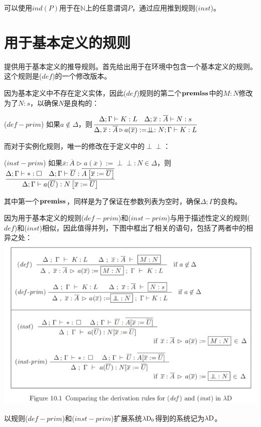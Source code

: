 \documentclass[UTF8]{article}
\newcommand{\dperp}{\perp\!\!\!\perp}
\begin{document}
		可以使用$ind(P)$用于在$\mathbb{N}$上的任意谓词$P$，通过应用推到规则($inst$)。
		
	\section{用于基本定义的规则}
	\noindent
	提供用于基本定义的推导规则。首先给出用于在环境中包含一个基本定义的规则。这个规则是($def$)的一个修改版本。
	
		因为基本定义中不存在定义实体，因此($def$)规则的第二个$\bf premiss$中的$M:N$修改为了$N:s$，以确保$N$是良构的：
		
		($def-prim$) 如果$a\notin\Delta$，则$\cfrac{\Delta;\Gamma\vdash K:L\ \ \ \Delta;\overline{x}:\overline{A}\vdash N:s}  {\Delta,\overline{x}:\overline{A}\triangleright a(\overline{x}):=\dperp:N;\Gamma\vdash K:L}$
		
		而对于实例化规则，唯一的修改在于定义中的$\dperp$：
		
		($inst-prim$) 如果$\overline{x}:\overline{A}\triangleright a(\overline{x}):=\dperp:N\in\Delta$，则$\cfrac{\Delta;\Gamma\vdash*:\square\ \ \ \Delta;\Gamma\vdash\overline{U}:\overline{A\left[\overline{x}:=\overline{U}\right]}}   {\Delta;\Gamma\vdash a(\overline{U}):N\left[\overline{x}:=\overline{U}\right]}$
		
		其中第一个$\bf premiss$，同样是为了保证在参数列表为空时，确保$\Delta;\Gamma$的良构。
		
		因为用于基本定义的规则($def-prim$)和($inst-prim$)与用于描述性定义的规则($def$)和($inst$)相似，因此值得并列，下图中框出了相关的语句，包括了两者中的相异之处：\\
		\includegraphics[width=0.93\linewidth]{"../imgs/10-2.png"}
		
		以规则($def-prim$)和($inst-prim$)扩展系统$\lambda{\rm D_0}$得到的系统记为$\lambda{\rm D}$。
		
\end{document}
